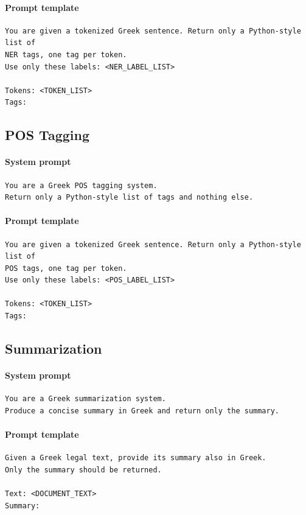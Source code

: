 \documentclass[sigconf,review,anonymous]{acmart}
\begin{document}
\paragraph{Prompt template}
\begin{verbatim}
You are given a tokenized Greek sentence. Return only a Python-style list of
NER tags, one tag per token.
Use only these labels: <NER_LABEL_LIST>

Tokens: <TOKEN_LIST>
Tags:
\end{verbatim}

\subsection{POS Tagging}
\paragraph{System prompt}
\begin{verbatim}
You are a Greek POS tagging system.
Return only a Python-style list of tags and nothing else.
\end{verbatim}
\paragraph{Prompt template}
\begin{verbatim}
You are given a tokenized Greek sentence. Return only a Python-style list of
POS tags, one tag per token.
Use only these labels: <POS_LABEL_LIST>

Tokens: <TOKEN_LIST>
Tags:
\end{verbatim}

\subsection{Summarization}
\paragraph{System prompt}
\begin{verbatim}
You are a Greek summarization system.
Produce a concise summary in Greek and return only the summary.
\end{verbatim}
\paragraph{Prompt template}
\begin{verbatim}
Given a Greek legal text, provide its summary also in Greek.
Only the summary should be returned.

Text: <DOCUMENT_TEXT>
Summary:
\end{verbatim}



\end{document}
